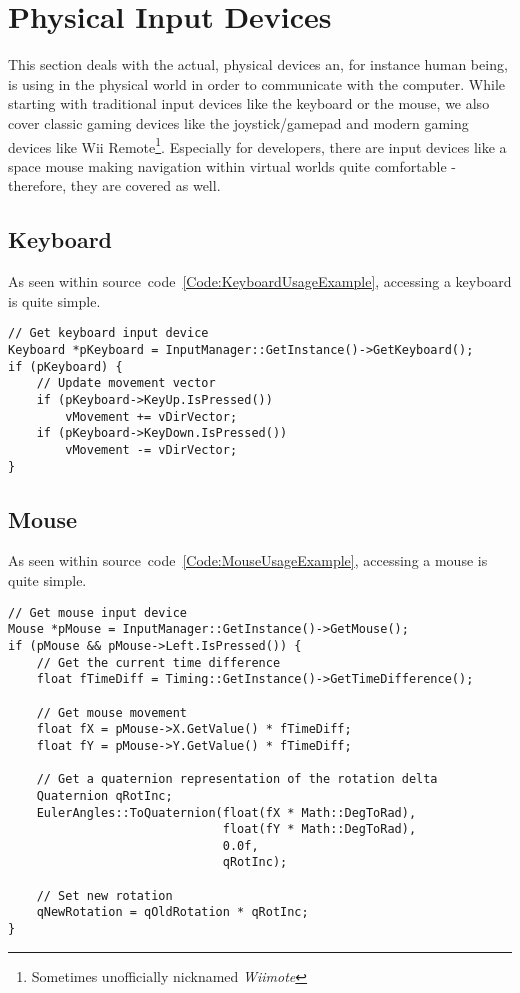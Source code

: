\section{Physical Input Devices}
\label{Chapter:PhysicalInputDevices}
This section deals with the actual, physical devices an, for instance human being, is using in the physical world in order to communicate with the computer. While starting with traditional input devices like the keyboard or the mouse, we also cover classic gaming devices like the joystick/gamepad and modern gaming devices like Wii Remote\footnote{Sometimes unofficially nicknamed \emph{Wiimote}}. Especially for developers, there are input devices like a space mouse making navigation within virtual worlds quite comfortable - therefore, they are covered as well.




\subsection{Keyboard}
As seen within source~code~\ref{Code:KeyboardUsageExample}, accessing a keyboard is quite simple.
\begin{lstlisting}[float=htb,label=Code:KeyboardUsageExample,caption={Keyboard usage example}]
// Get keyboard input device
Keyboard *pKeyboard = InputManager::GetInstance()->GetKeyboard();
if (pKeyboard) {
	// Update movement vector
	if (pKeyboard->KeyUp.IsPressed())
		vMovement += vDirVector;
	if (pKeyboard->KeyDown.IsPressed())
		vMovement -= vDirVector;
}
\end{lstlisting}




\subsection{Mouse}
As seen within source~code~\ref{Code:MouseUsageExample}, accessing a mouse is quite simple.
\begin{lstlisting}[float=htb,label=Code:MouseUsageExample,caption={Mouse usage example}]
// Get mouse input device
Mouse *pMouse = InputManager::GetInstance()->GetMouse();
if (pMouse && pMouse->Left.IsPressed()) {
	// Get the current time difference
	float fTimeDiff = Timing::GetInstance()->GetTimeDifference();

	// Get mouse movement
	float fX = pMouse->X.GetValue() * fTimeDiff;
	float fY = pMouse->Y.GetValue() * fTimeDiff;

	// Get a quaternion representation of the rotation delta
	Quaternion qRotInc;
	EulerAngles::ToQuaternion(float(fX * Math::DegToRad),
							  float(fY * Math::DegToRad),
							  0.0f,
							  qRotInc);

	// Set new rotation
	qNewRotation = qOldRotation * qRotInc;
}
\end{lstlisting}




